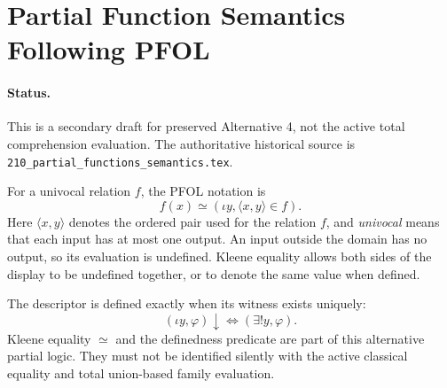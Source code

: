 \def\topic{Partial Functions: Alternative PFOL Draft}

\section{Partial Function Semantics Following PFOL}

\paragraph{Status.}
This is a secondary draft for preserved Alternative 4, not the active total
comprehension evaluation. The authoritative historical source is
\texttt{210\_partial\_functions\_semantics.tex}.

For a univocal relation $f$, the PFOL notation is
\[
f(x)\simeq(\iota y,\langle x,y\rangle\in f).
\]
Here $\langle x,y\rangle$ denotes the ordered pair used for the relation
$f$, and \emph{univocal} means that each input has at most one output. An
input outside the domain has no output, so its evaluation is undefined.
Kleene equality allows both sides of the display to be undefined together,
or to denote the same value when defined.

The descriptor is defined exactly when its witness exists uniquely:
\[
(\iota y,\varphi)\downarrow\iff(\exists!y,\varphi).
\]
Kleene equality $\simeq$ and the definedness predicate are part of this
alternative partial logic. They must not be identified silently with the
active classical equality and total union-based family evaluation.


